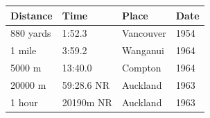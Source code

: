 \documentclass{article}
\begin{document}
\begin{tabular}{llll}
\toprule
Distance & Time & Place & Date \\
\midrule
880 yards & 1:52.3 & Vancouver & 1954 \\
1 mile & 3:59.2 & Wanganui & 1964 \\
5000 m & 13:40.0 & Compton & 1964 \\
20000 m & 59:28.6 NR & Auckland & 1963 \\
1 hour & 20190m NR & Auckland & 1963 \\
\bottomrule
\end{tabular}
\end{document}
